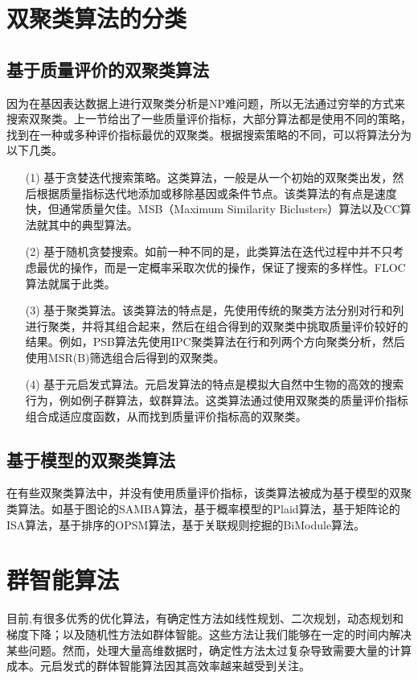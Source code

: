 \section{双聚类算法的分类}
  \subsection{基于质量评价的双聚类算法}
  因为在基因表达数据上进行双聚类分析是NP难问题，所以无法通过穷举的方式来搜索双聚类。上一节给出了一些质量评价指标，大部分算法都是使用不同的策略，找到在一种或多种评价指标最优的双聚类。根据搜索策略的不同，可以将算法分为以下几类。
  \begin{enumerate}
    \item[(1)] 基于贪婪迭代搜索策略。这类算法，一般是从一个初始的双聚类出发，然后根据质量指标迭代地添加或移除基因或条件节点。该类算法的有点是速度快，但通常质量欠佳。MSB（Maximum Similarity Biclusters）算法以及CC算法就其中的典型算法。

    \item[(2)] 基于随机贪婪搜索。如前一种不同的是，此类算法在迭代过程中并不只考虑最优的操作，而是一定概率采取次优的操作，保证了搜索的多样性。FLOC算法就属于此类。
    
    \item[(3)] 基于聚类算法。该类算法的特点是，先使用传统的聚类方法分别对行和列进行聚类，并将其组合起来，然后在组合得到的双聚类中挑取质量评价较好的结果。例如，PSB算法先使用IPC聚类算法在行和列两个方向聚类分析，然后使用MSR(B)筛选组合后得到的双聚类。
    
    \item[(4)] 基于元启发式算法。元启发算法的特点是模拟大自然中生物的高效的搜索行为，例如例子群算法，蚁群算法。这类算法通过使用双聚类的质量评价指标组合成适应度函数，从而找到质量评价指标高的双聚类。
  \end{enumerate}
  \subsection{基于模型的双聚类算法}
  在有些双聚类算法中，并没有使用质量评价指标，该类算法被成为基于模型的双聚类算法。如基于图论的SAMBA算法，基于概率模型的Plaid算法，基于矩阵论的ISA算法，基于排序的OPSM算法，基于关联规则挖掘的BiModule算法。

\section{群智能算法}

    目前,有很多优秀的优化算法，有确定性方法如线性规划、二次规划，动态规划和梯度下降；以及随机性方法如群体智能。这些方法让我们能够在一定的时间内解决某些问题。然而，处理大量高维数据时，确定性方法太过复杂导致需要大量的计算成本。元启发式的群体智能算法因其高效率越来越受到关注。

